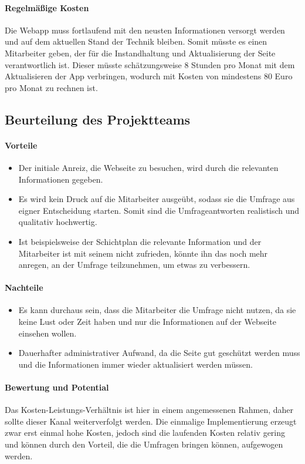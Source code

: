 \paragraph{Regelmäßige Kosten}
Die Webapp muss fortlaufend mit den neusten Informationen versorgt werden und auf dem aktuellen Stand der Technik bleiben. Somit müsste es einen Mitarbeiter geben, der für die Instandhaltung und Aktualisierung der Seite verantwortlich ist. Dieser müsste schätzungsweise 8 Stunden pro Monat mit dem Aktualisieren der App verbringen, wodurch mit Kosten von mindestens 80 Euro pro Monat zu rechnen ist.

\subsection{Beurteilung des Projektteams}

\paragraph{Vorteile}
\begin{itemize} 
\item Der initiale Anreiz, die Webseite zu besuchen, wird durch die relevanten Informationen gegeben.
\item Es wird kein Druck auf die Mitarbeiter ausgeübt, sodass sie die Umfrage aus eigner Entscheidung starten. Somit sind die Umfrageantworten realistisch und qualitativ hochwertig.
\item Ist beispielsweise der Schichtplan die relevante Information und der Mitarbeiter ist mit seinem nicht zufrieden, könnte ihn das noch mehr anregen, an der Umfrage teilzunehmen, um etwas zu verbessern.
\end{itemize}


\paragraph{Nachteile}
\begin{itemize}
\item Es kann durchaus sein, dass die Mitarbeiter die Umfrage nicht nutzen, da sie keine Lust oder Zeit haben und nur die Informationen auf der Webseite einsehen wollen.
\item Dauerhafter administrativer Aufwand, da die Seite gut geschützt werden muss und die Informationen immer wieder aktualisiert werden müssen.
\end{itemize}


\paragraph{Bewertung und Potential}%
Das Kosten-Leistungs-Verhältnis ist hier in einem angemessenen Rahmen, daher sollte dieser Kanal weiterverfolgt werden. Die einmalige Implementierung erzeugt zwar erst einmal hohe Kosten, jedoch sind die laufenden Kosten relativ gering und können durch den Vorteil, die die Umfragen bringen können, aufgewogen werden.

